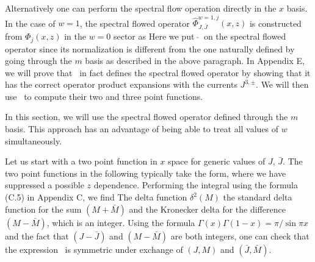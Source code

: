 Alternatively one can perform the spectral flow operation
directly in the $x$ basis. In the case of $w=1$,
the spectral flowed operator
$\widehat{\Phi}_{J, \bar J}^{w=1, j}(x,z)$ is
constructed from $\Phi_j(x,z)$ in the $w=0$ sector as
\eqn{}
Here we put $~\widehat{}~$ on the spectral flowed operator
since its normalization is different from the one naturally
defined by going through the $m$ basis as described in the
above paragraph. In Appendix E, we will prove that \flowinxbasis\
in fact defines the spectral flowed operator by showing that
it has the correct operator product expansions with the
currents $J^{3,\pm}$. We will then use \flowinxbasis\ to
compute their two and three point functions.

In this section, we will use the spectral flowed operator defined
through the $m$ basis. This approach has an advantage of being
able to treat all values of $w$ simultaneously.



Let us start with a two point function in $x$ space
for generic values of $J$, $\bar J$.  The two point functions
in the following typically take the form,
\eqn{}
where we have suppressed  a possible  $z$ dependence.
Performing the integral using the formula (C.5)
in Appendix C, we
find
\eqn{}
The delta function $\delta^2 (M)$  the standard
delta function for the sum $(M+\bar M)$ and the Kronecker delta
for the difference $(M-\bar M)$, which is an integer.
Using the formula $\Gamma(x)\Gamma(1-x) = \pi / \sin\pi x$
and  the fact that $(J-\bar J)$ and $(M-\bar M)$ are both integers,
one can check that the expression \startm\ is symmetric under exchange
of $(J, M)$ and $(\bar J, \bar M)$.

